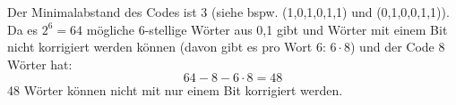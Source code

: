 \documentclass{article} %
\begin{document}
\begin{mybox}
Der Minimalabstand des Codes ist 3 (siehe bspw. (1,0,1,0,1,1)  und (0,1,0,0,1,1)). Da es $2^6 = 64$ mögliche 6-stellige Wörter aus 0,1 gibt und Wörter mit einem Bit nicht korrigiert werden können (davon gibt es pro Wort 6: $6 \cdot 8$) und der Code 8 Wörter hat: 
\[64-8-6\cdot 8=48\]
48 Wörter können nicht mit nur einem Bit korrigiert werden. 
\end{mybox}
\end{document}
